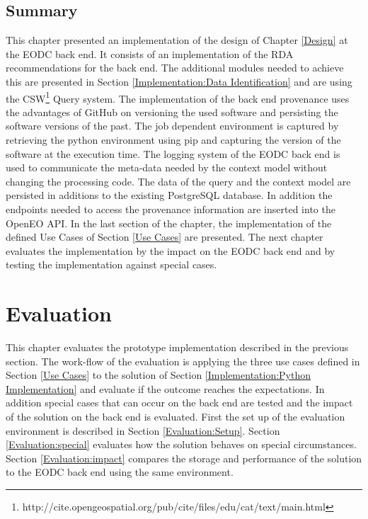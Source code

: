 \documentclass[draft,final]{vutinfth} %
\begin{document}
\section{Summary}
This chapter presented an implementation of the design of Chapter \ref{Design} at the EODC back end. It consists of an implementation of the RDA recommendations for the back end. The additional modules needed to achieve this are presented in Section \ref{Implementation:Data Identification} and are using the CSW\footnote{http://cite.opengeospatial.org/pub/cite/files/edu/cat/text/main.html} Query system. The implementation of the back end provenance uses the advantages of GitHub on versioning the used software and persisting the software versions of the past. The job dependent environment is captured by retrieving the python environment using pip and capturing the version of the software at the execution time. The logging system of the EODC back end is used to communicate the meta-data needed by the context model without changing the processing code. The data of the query and the context model are persisted in additions to the existing PostgreSQL database. In addition the endpoints needed to access the provenance information are inserted into the OpenEO API. In the last section of the chapter, the implementation of the defined Use Cases of Section \ref{Use Cases} are presented. The next chapter evaluates the implementation by the impact on the EODC back end and by testing the implementation against special cases.    
\chapter{Evaluation}\label{Evaluation}
This chapter evaluates the prototype implementation described in the previous section. The work-flow of the evaluation is applying the three use cases defined in Section \ref{Use Cases} to the solution of Section \ref{Implementation:Python Implementation} and evaluate if the outcome reaches the expectations. In addition special cases that can occur on the back end are tested and the impact of the solution on the back end is evaluated. First the set up of the evaluation environment is described in Section \ref{Evaluation:Setup}. Section \ref{Evaluation:special} evaluates how the solution behaves on special circumstances. Section \ref{Evaluation:impact} compares the storage and performance of the solution to the EODC back end using the same environment. 
\end{document}
